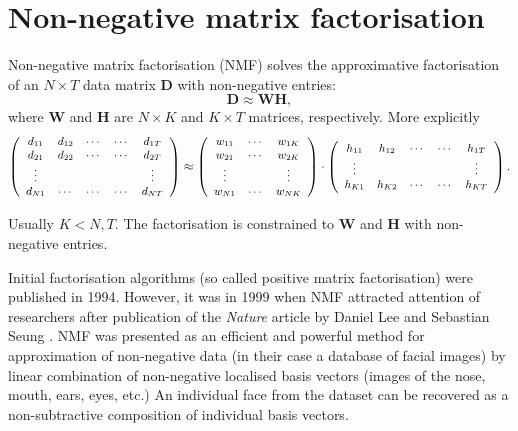\section{Non-negative matrix factorisation\label{sec:NMF}}
Non-negative matrix factorisation (NMF) solves the approximative factorisation of an $N\times T$ data matrix $\bm{D}$ with non-negative entries:
%
\begin{equation}
	\bm{D}\approx\bm{WH},
	\label{eq:NMF approx}
\end{equation}
%
where $\bm{W}$ and $\bm{H}$ are $N\times K$ and $K\times T$  matrices, respectively. More explicitly
\begin{equation}
	\small
	\left(
	\begin{array}{ccccc} 
		d_{11} & d_{12} & \cdots &\cdots & d_{1T} \\
		d_{21} & d_{22} & \cdots & \cdots & d_{2T} \\
		\vdots & & & & \vdots\\
		d_{N1}& \cdots & \cdots & \cdots & d_{NT}\\
	\end{array}
	\right)
	\approx
	\left(
	\begin{array}{ccc} 
		w_{11} &\cdots &w_{1K} \\
		w_{21} & \cdots & w_{2K} \\
		\vdots & & \vdots\\	
		w_{N1}& \cdots & w_{NK}\\
	\end{array}
	\right)
	\cdot
	\left(
	\begin{array}{ccccc} 
		h_{11} &h_{12}&\cdots &\cdots & h_{1T} \\
		\vdots & & & & \vdots\\
		h_{K1} &h_{K2}&\cdots &\cdots & h_{KT} \\
	\end{array}
	\right).
	\label{eq:NMF approx explicit}
\end{equation}

Usually $K<N,T$. The factorisation is constrained to $\bm{W}$ and $\bm{H}$ with non-negative entries. 

Initial factorisation algorithms (so called positive matrix factorisation) \cite{Paatero1994} were published in 1994. However, it was in 1999 when NMF attracted attention of researchers after publication of the \emph{Nature} article by Daniel Lee and Sebastian Seung \cite{Lee1999}. NMF was presented as an efficient and powerful method for approximation of non-negative data (in their case a database of facial images) by linear combination of non-negative localised basis vectors (images of the nose, mouth, ears, eyes, etc.) An individual face from the dataset can be recovered as a non-subtractive composition of individual basis vectors. 

